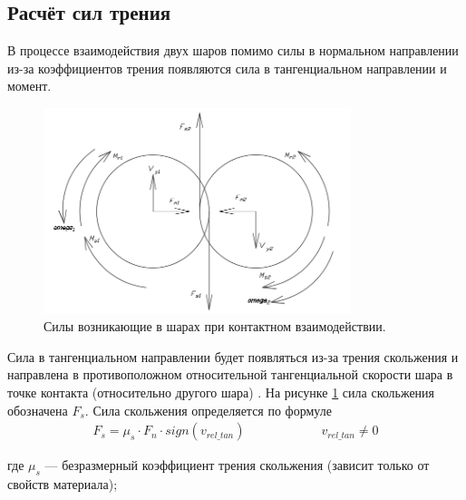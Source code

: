 \documentclass[a4paper]{article}
\begin{document}









\subsection{Расчёт сил трения}
\label{angular_subsection}

В процессе взаимодействия двух шаров помимо силы в нормальном направлении из-за коэффициентов трения появляются сила в тангенциальном направлении и момент.

\begin{figure}[h!]
	\centering
	\includegraphics[width=0.8\textwidth]{sily}
	\caption{Силы возникающие в шарах при контактном взаимодействии.}
	\label{pic:sily}
\end{figure} 

Сила в тангенциальном направлении будет появляться из-за трения скольжения и направлена в противоположном относительной тангенциальной скорости шара в точке контакта (относительно другого шара) \cite{friction_calibration}. На рисунке \ref{pic:sily} сила скольжения обозначена $F_s$. Сила скольжения определяется по формуле
\begin{align}
\label{sliding_force}
F_s = \mu_s \cdot F_n \cdot sign(v_{rel\_tan}) \qquad \qquad \qquad v_{rel\_tan} \neq 0
\end{align}

где $\mu_s$ --- безразмерный коэффициент трения скольжения (зависит только от свойств материала);
\end{document}
